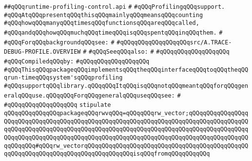 \label{src/lib/std/src/nj/runtime-profiling-control.api}
\verb|##qQQqruntime-profiling-control.api|\newline
\verb|#|\newline
\verb|#qQQqProfilingqQQqsupport.|\newline
\verb|#qQQqAtqQQqpresentqQQqthisqQQqmainlyqQQqmeansqQQqcounting|\newline
\verb|#qQQqhowqQQqmanyqQQqtimesqQQqfunctionsqQQqareqQQqcalled,|\newline
\verb|#qQQqandqQQqhowqQQqmuchqQQqtimeqQQqisqQQqspentqQQqinqQQqthem.|\newline
\verb|#|\newline
\verb|#qQQqForqQQqbackgroundqQQqsee:|\newline
\verb|#|\newline
\verb|#qQQqqQQqqQQqqQQqqQQqsrc/A.TRACE-DEBUG-PROFILE.OVERVIEW|\newline
\verb|#|\newline
\verb|#qQQqSeeqQQqalso:|\newline
\verb|#|\newline
\verb|#qQQqqQQqqQQqqQQqqQQq|\newline
\newline
\verb|#qQQqCompiledqQQqby:|\newline
\verb|#qQQqqQQqqQQqqQQqqQQq|\newline
\newline
\newline
\newline
\verb|#qQQqThisqQQqpackageqQQqimplementsqQQqtheqQQqinterfaceqQQqtoqQQqtheqQQqrun-timeqQQqsystem'sqQQqprofiling|\newline
\verb|#qQQqsupportqQQqlibrary.qQQqqQQqItqQQqisqQQqnotqQQqmeantqQQqforqQQqgeneralqQQquse.qQQqqQQqForqQQqgeneralqQQquseqQQqsee:|\newline
\verb|#|\newline
\verb|#qQQqqQQqqQQqqQQqqQQq|\newline
\newline
\verb|stipulate|\newline
\verb|qQQqqQQqqQQqqQQqpackageqQQqrwvqQQq=qQQqqQQqrw_vector;qQQqqQQqqQQqqQQqqQQqqQQqqQQqqQQqqQQqqQQqqQQqqQQqqQQqqQQqqQQqqQQqqQQqqQQqqQQqqQQqqQQqqQQqqQQqqQQqqQQqqQQqqQQqqQQqqQQqqQQqqQQqqQQqqQQqqQQqqQQqqQQqqQQqqQQqqQQqqQQqqQQqqQQqqQQqqQQqqQQqqQQqqQQqqQQqqQQqqQQqqQQqqQQqqQQqqQQqqQQqqQQqqQQqqQQqqQQq#qQQqrw_vectorqQQqqQQqqQQqqQQqqQQqqQQqqQQqqQQqqQQqqQQqqQQqqQQqqQQqqQQqqQQqqQQqqQQqqQQqqQQqqQQqqQQqisqQQqfromqQQqqQQqqQQq|\newline
